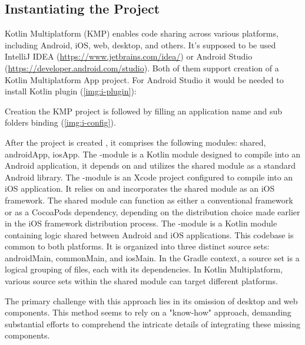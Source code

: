 
\subsection{Instantiating the Project}

Kotlin Multiplatform (KMP) enables code sharing across various platforms, including Android, iOS, web, desktop, and 
others. It's supposed to be used IntelliJ IDEA (\href{https://www.jetbrains.com/idea/}{https://www.jetbrains.com/idea/}) 
or Android Studio (\href{https://developer.android.com/studio}{https://developer.android.com/studio}). Both of them 
support creation of a Kotlin Multiplatform App project. For Android Studio it would be needed to install Kotlin plugin
(\cref{img:i-plugin}):


\noindent Creation the KMP project is followed by filling an application name and sub folders binding (\cref{img:i-config}).


\noindent After the project is created , it comprises the following modules: shared, androidApp, iosApp. The 
-module is a Kotlin module designed to compile into an Android application, it depends on and utilizes the 
shared module as a standard Android library. The -module is an Xcode project configured to compile into an iOS 
application. It relies on and incorporates the shared module as an iOS framework. The shared module can function as 
either a conventional framework or as a CocoaPods dependency, depending on the distribution choice made earlier in the 
iOS framework distribution process. The -module is a Kotlin module containing logic shared between Android and 
iOS applications. This codebase is common to both platforms. It is organized into three distinct source sets: androidMain, 
commonMain, and iosMain. In the Gradle context, a source set is a logical grouping of files, each with its dependencies. 
In Kotlin Multiplatform, various source sets within the shared module can target different platforms.

The primary challenge with this approach lies in its omission of desktop and web components. This method seems to rely 
on a "know-how" approach, demanding substantial efforts to comprehend the intricate details of integrating these missing 
components. 

